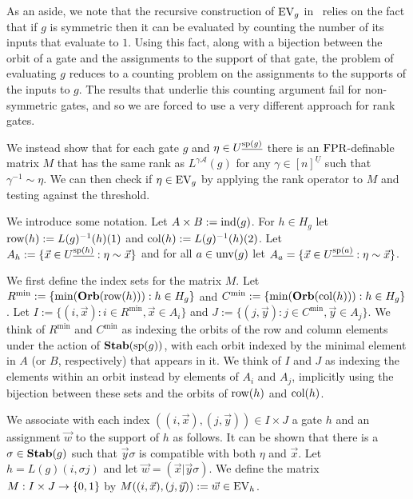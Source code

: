 \documentclass[a4paper,UKenglish]{lipics-v2018}
\begin{document}
As an aside, we note that the recursive construction of $\text{EV}_g$
in~\cite{AndersonD17} relies on the fact that if $g$ is symmetric then it can be
evaluated by counting the number of its inputs that evaluate to $1$. Using this
fact, along with a bijection between the orbit of a gate and the assignments to
the support of that gate, the problem of evaluating $g$ reduces to a counting
problem on the assignments to the supports of the inputs to $g$. The results
that underlie this counting argument fail for non-symmetric gates, and so we are
forced to use a very different approach for rank gates.

We instead show that for each gate $g$ and $\eta \in U^{\underline{\text{sp}(g)}}$
there is an $\text{\upshape FPR}$-definable matrix $M$ that has the same rank as $L^{\gamma
  \mathcal{A}}(g)$ for any $\gamma \in [n]^{\underline{U}}$ such that
$\gamma^{-1} \sim \eta$. We can then check if $\eta \in \text{EV}_g$ by applying the
rank operator to $M$ and testing against the threshold.

We introduce some notation. Let $A \times B := \text{\upshape ind}(g)$. For $h \in H_g$ let
$\text{row}(h) := L(g)^{-1}(h)(1)$ and $\text{col}(h) := L(g)^{-1}(h)(2)$. Let $A_h := \{
\vec{x} \in U^{\underline{\text{sp}(h)}} : \eta \sim \vec{x} \}$ and for all $a \in
\text{unv}(g)$ let $A_a = \{\vec{x} \in U^{\underline{\text{sp}(a)}} : \eta \sim
\vec{x}\}$.

We first define the index sets for the matrix $M$. Let $R^{\min} := \{\min
(\text{\textbf{Orb}}(\text{row}(h))) : h \in H_g\}$ and $C^{\min} := \{ \min (\text{\textbf{Orb}} (\text{col}(h))) : h
\in H_g\}$. Let $I := \{(i, \vec{x}): i \in R^{\min}, \vec{x} \in A_i\}$ and $J
:= \{(j, \vec{y}): j \in C^{\min}, \vec{y} \in A_j\}$. We think of $R^{\min}$
and $C^{\min}$ as indexing the orbits of the row and column elements under the
action of $\text{\textbf{Stab}}(\text{sp}(g))$, with each orbit indexed by the minimal element in
$A$ (or $B$, respectively) that appears in it. We think of $I$ and $J$ as
indexing the elements within an orbit instead by elements of $A_i$ and $A_j$,
implicitly using the bijection between these sets and the orbits of $\text{row}(h)$
and $\text{col}(h)$.

We associate with each index $((i, \vec{x}), (j, \vec{y})) \in I \times J$ a
gate $h$ and an assignment $\vec{w}$ to the support of $h$ as follows. It can be
shown that there is a $\sigma \in \text{\textbf{Stab}}(g)$ such that $\vec{y} \sigma$ is
compatible with both $\eta$ and $\vec{x}$. Let $h = L(g)(i, \sigma j)$ and let
$\vec{w} = (\vec{x} \vert \vec{y} \sigma)$. We define the matrix $M : I \times J
\rightarrow \{0,1\}$ by $M((i , \vec{x}), (j, \vec{y})) := \vec{w} \in \text{EV}_h$.
\end{document}
